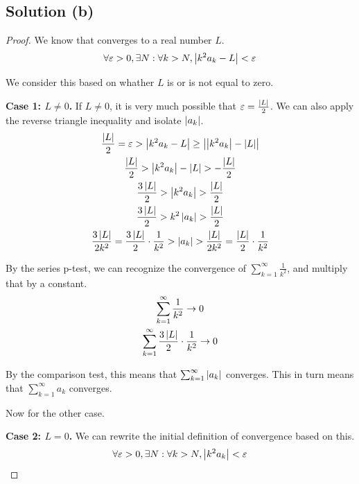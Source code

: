 \documentclass[12pt]{report}
\newenvironment{case}[2]{\par\textbf{Case #1: #2.}}{}
\begin{document}
    \subsection{Solution (b)}
        \begin{proof}
            We know that  converges to a real number $L$.
            \begin{equation}
                \forall\varepsilon > 0, \exists N : \forall k > N, \left| k^2 a_k - L \right| < \varepsilon
            \end{equation}
    
            We consider this based on whather $L$ is or is not equal to zero.
            \begin{case}{1}{$L \neq 0$}
                If $L \neq 0$, it is very much possible that $\varepsilon = \frac{\left| L \right|}{2}$.
                We can also apply the reverse triangle inequality and isolate $\left| a_k \right|$.
                \begin{gather}
                    \frac{\left| L \right|}{2} = \varepsilon > \left| k^2 a_k - L \right| \geq \left| \left| k^2 a_k \right| - \left| L \right| \right|\\
                    \frac{\left| L \right|}{2} > \left| k^2 a_k \right| - \left| L \right| > -\frac{\left| L \right|}{2}\\
                    \frac{3\left| L \right|}{2} > \left| k^2 a_k \right| > \frac{\left| L \right|}{2}\\
                    \frac{3\left| L \right|}{2} > k^2\left| a_k \right| > \frac{\left| L \right|}{2}\\
                    \frac{3\left| L \right|}{2k^2} = \frac{3\left| L \right|}{2} \cdot \frac{1}{k^2} > \left| a_k \right| > \frac{\left| L \right|}{2k^2} = \frac{\left| L \right|}{2} \cdot \frac{1}{k^2}
                \end{gather}

                By the series p-test, we can recognize the convergence of $\sum_{k = 1}^{\infty} \frac{1}{k^2}$, and multiply that by a constant.
                \begin{gather}
                    \sum_{k = 1}^{\infty} \frac{1}{k^2} \to 0\\
                    \sum_{k = 1}^{\infty} \frac{3\left| L \right|}{2} \cdot \frac{1}{k^2} \to 0
                \end{gather}

                By the comparison test, this means that $\sum_{k=1}^{\infty} \left| a_k \right|$ converges.
                This in turn means that $\sum_{k=1}^{\infty} a_k$ converges.
            \end{case}

            Now for the other case. 
            \begin{case}{2}{$L = 0$}
                We can rewrite the initial definition of convergence based on this.
                \begin{equation}
                    \forall\varepsilon > 0, \exists N : \forall k > N, \left| k^2 a_k \right| < \varepsilon
                \end{equation}


\end{case}
\end{proof}
\end{document}
